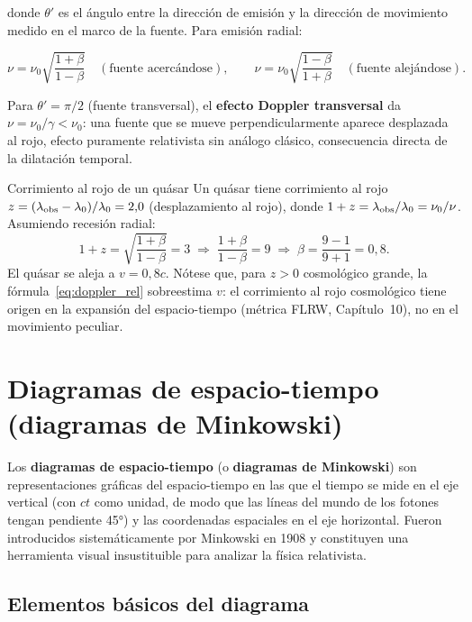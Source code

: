 donde $\theta'$ es el ángulo entre la dirección de emisión y la dirección de movimiento medido en el marco de la fuente. Para emisión radial:

\begin{equation}
  \nu = \nu_0 \sqrt{\frac{1+\beta}{1-\beta}} \quad (\text{fuente acercándose}),
  \qquad
  \nu = \nu_0 \sqrt{\frac{1-\beta}{1+\beta}} \quad (\text{fuente alejándose}).
  \label{eq:doppler_rel}
\end{equation}

Para $\theta' = \pi/2$ (fuente transversal), el \textbf{efecto Doppler transversal} da $\nu = \nu_0/\gamma < \nu_0$: una fuente que se mueve perpendicularmente aparece desplazada al rojo, efecto puramente relativista sin análogo clásico, consecuencia directa de la dilatación temporal.

\begin{ejemplo}{Corrimiento al rojo de un quásar}{}
Un quásar tiene corrimiento al rojo $z = (\lambda_{\rm obs} - \lambda_0)/\lambda_0 = 2{,}0$ (desplazamiento al rojo), donde $1 + z = \lambda_{\rm obs}/\lambda_0 = \nu_0/\nu$. Asumiendo recesión radial:
\[
  1 + z = \sqrt{\frac{1+\beta}{1-\beta}} = 3 \;\Rightarrow\; \frac{1+\beta}{1-\beta} = 9 \;\Rightarrow\; \beta = \frac{9-1}{9+1} = 0{,}8.
\]
El quásar se aleja a $v = 0{,}8c$. Nótese que, para $z > 0$ cosmológico grande, la fórmula~\eqref{eq:doppler_rel} sobreestima $v$: el corrimiento al rojo cosmológico tiene origen en la expansión del espacio-tiempo (métrica FLRW, Capítulo~10), no en el movimiento peculiar.
\end{ejemplo}

\section{Diagramas de espacio-tiempo (diagramas de Minkowski)}

Los \textbf{diagramas de espacio-tiempo} (o \textbf{diagramas de Minkowski}) son representaciones gráficas del espacio-tiempo en las que el tiempo se mide en el eje vertical (con $ct$ como unidad, de modo que las líneas del mundo de los fotones tengan pendiente 45°) y las coordenadas espaciales en el eje horizontal. Fueron introducidos sistemáticamente por Minkowski en 1908 y constituyen una herramienta visual insustituible para analizar la física relativista.

\subsection{Elementos básicos del diagrama}

